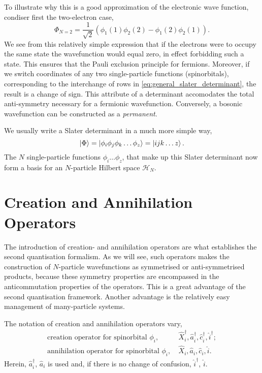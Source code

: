 To illustrate why this is a good approximation of the electronic wave function,
condiser first the two-electron case,
\begin{equation}
    \Phi_{N=2} = \frac{1}{\sqrt{2}}(\phi_1(1)\phi_2(2) - \phi_1(2)\phi_2(1)).
\end{equation}
We see from this relatively simple expression that if the electrons were to occupy
the same state the wavefunction would equal zero, in effect forbidding such a state.
This ensures that the Pauli exclusion principle for 
fermions\cite{pauli1925zusammenhang}. Moreover, if we switch coordinates of any two 
single-particle functions (spinorbitals), corresponding to the interchange of rows in
\autoref{eq:general_slater_determinant}, the result is a change of sign. This attribute
of a determinant accomodates the total anti-symmetry necessary for a fermionic wavefunction.
Conversely, a bosonic wavefunction can be constructed as a \emph{permanent}.

We usually write a Slater determinant in a much more simple way,
    \begin{equation}
        \ket{\Phi} = \ket{\phi_i \phi_j \phi_k \dots \phi_z} = \ket{ijk \dots z}.
    \end{equation}
The $N$ single-particle functions $\phi_i\dots\phi_z$, that make up this Slater determinant
now form a basis for an $N$-particle Hilbert space $\mathcal{H}_N$. 

\section{Creation and Annihilation Operators}
   
    The introduction of creation- and annihilation operators are what establishes
    the second quantisation formalism. As we will see, such operators makes the 
    construction of $N$-particle wavefunctions as symmetrised or anti-symmetrised
    products, because these symmetry properties are encompassed in the 
    anticommutation properties of the operators. This is a great advantage of the 
    second quantisation framework. Another advantage is the relatively easy 
    management of many-particle systems. 

    The notation of creation and annihilation operators vary,
    \begin{align*}
        \text{creation operator for spinorbital } \phi_i, &\ 
        \hat{X}_i^\dagger, \hat{a}^\dagger_i, \hat{c}_i^\dagger, \hat{i}^\dagger; \\
        \text{annihilation operator for spinorbital } \phi_i, &\ 
        \hat{X}_i, \hat{a}_i, \hat{c}_i, \hat{i}.       
    \end{align*}
    Herein, $\hat{a}_i^\dagger$, $\hat{a}_i$ is used and, if there is no change of 
    confusion, $\hat{i}^\dagger$, $\hat{i}$.

